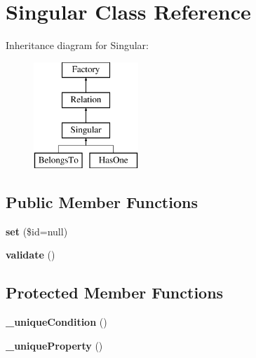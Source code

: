 \hypertarget{classSingular}{
\section{Singular Class Reference}
\label{classSingular}
}
Inheritance diagram for Singular:\begin{figure}[H]
\begin{center}
\leavevmode
\includegraphics[height=4.000000cm]{classSingular}
\end{center}
\end{figure}
\subsection*{Public Member Functions}
\begin{DoxyCompactItemize}
\item 
\hypertarget{classSingular_a69dc615049dbd335534be1716ea23ba8}{
{\bfseries set} (\$id=null)}
\label{classSingular_a69dc615049dbd335534be1716ea23ba8}

\item 
\hypertarget{classSingular_ababd8fba6164f89f1f823f77864e51d1}{
{\bfseries validate} ()}
\label{classSingular_ababd8fba6164f89f1f823f77864e51d1}

\end{DoxyCompactItemize}
\subsection*{Protected Member Functions}
\begin{DoxyCompactItemize}
\item 
\hypertarget{classSingular_a4195dcfca893ee37f9c8b55e093f4214}{
{\bfseries \_\-uniqueCondition} ()}
\label{classSingular_a4195dcfca893ee37f9c8b55e093f4214}

\item 
\hypertarget{classSingular_ab963b8c035bfc164b3a2eec4a32a4aba}{
{\bfseries \_\-uniqueProperty} ()}
\label{classSingular_ab963b8c035bfc164b3a2eec4a32a4aba}

\end{DoxyCompactItemize}
